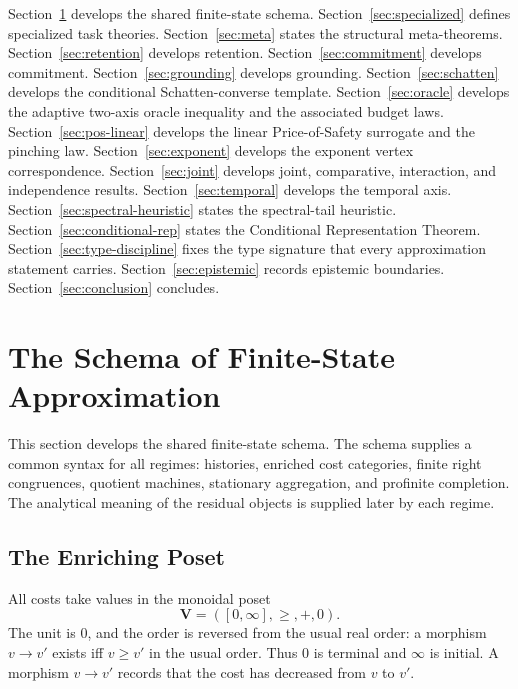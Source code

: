\documentclass[12pt]{article}
\theoremstyle{definition}
\begin{document}
Section~\ref{sec:schema} develops the shared finite-state schema.
Section~\ref{sec:specialized} defines specialized task theories.
Section~\ref{sec:meta} states the structural meta-theorems.
Section~\ref{sec:retention} develops retention.
Section~\ref{sec:commitment} develops commitment.
Section~\ref{sec:grounding} develops grounding.
Section~\ref{sec:schatten} develops the conditional Schatten-converse
template.
Section~\ref{sec:oracle} develops the adaptive two-axis oracle inequality and
the associated budget laws.
Section~\ref{sec:pos-linear} develops the linear Price-of-Safety surrogate and
the pinching law.
Section~\ref{sec:exponent} develops the exponent vertex correspondence.
Section~\ref{sec:joint} develops joint, comparative, interaction, and
independence results.
Section~\ref{sec:temporal} develops the temporal axis.
Section~\ref{sec:spectral-heuristic} states the spectral-tail heuristic.
Section~\ref{sec:conditional-rep} states the Conditional Representation
Theorem.
Section~\ref{sec:type-discipline} fixes the type signature that every
approximation statement carries.
Section~\ref{sec:epistemic} records epistemic boundaries.
Section~\ref{sec:conclusion} concludes.

\section{The Schema of Finite-State Approximation}
\label{sec:schema}

This section develops the shared finite-state schema.  The schema supplies a
common syntax for all regimes: histories, enriched cost categories, finite
right congruences, quotient machines, stationary aggregation, and profinite
completion.  The analytical meaning of the residual objects is supplied later
by each regime.

\subsection{The Enriching Poset}
\label{subsec:enriching-poset}

All costs take values in the monoidal poset
\[
\mathbf V=([0,\infty],\ge,+,0).
\]
The unit is $0$, and the order is reversed from the usual real order: a
morphism $v\to v'$ exists iff $v\ge v'$ in the usual order.  Thus $0$ is
terminal and $\infty$ is initial.  A morphism $v\to v'$ records that the cost
has decreased from $v$ to $v'$.
\end{document}
